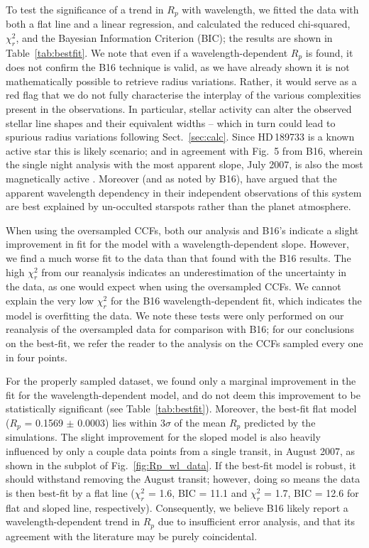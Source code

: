 \documentclass{aa}
\begin{document}
To test the significance of a trend in $R_p$ with wavelength, we fitted the data with both a flat line and a linear regression, and calculated the reduced chi-squared, $\chi^2_r$, and the Bayesian Information Criterion (BIC); the results are shown in Table~\ref{tab:bestfit}. We note that even if a wavelength-dependent $R_p$ is found, it does not confirm the B16 technique is valid, as we have already shown it is not mathematically possible to retrieve radius variations. Rather, it would serve as a red flag that we do not fully characterise the interplay of the various complexities present in the observations. In particular, stellar activity can alter the observed stellar line shapes and their equivalent widths -- which in turn could lead to spurious radius variations following Sect.~\ref{sec:calc}. Since HD\,189733 is a known active star this is likely scenario; and in agreement with Fig.~5 from B16, wherein the single night analysis with the most apparent slope, July 2007, is also the most magnetically active \citep{cegla16b}. Moreover (and as noted by B16), \cite{mccullough14} have argued that the apparent wavelength dependency in their independent observations of this system are best explained by un-occulted starspots rather than the planet atmosphere.

When using the oversampled CCFs, both our analysis and B16's indicate a slight improvement in fit for the model with a wavelength-dependent slope. However, we find a much worse fit to the data than that found with the B16 results. The high $\chi^2_r$ from our reanalysis indicates an underestimation of the uncertainty in the data, as one would expect when using the oversampled CCFs.  We cannot explain the very low $\chi^2_r$ for the B16 wavelength-dependent fit, which indicates the model is overfitting the data. We note these tests were only performed on our reanalysis of the oversampled data for comparison with B16; for our conclusions on the best-fit, we refer the reader to the analysis on the CCFs sampled every one in four points.

For the properly sampled dataset, we found only a marginal improvement in the fit for the wavelength-dependent model, and do not deem this improvement to be statistically significant (see Table~\ref{tab:bestfit}). Moreover, the best-fit flat model ($R_p$ = 0.1569 $\pm$ 0.0003) lies within 3$\sigma$ of the mean $R_p$ predicted by the simulations. The slight improvement for the sloped model is also heavily influenced by only a couple data points from a single transit, in August 2007, as shown in the subplot of Fig.~\ref{fig:Rp_wl_data}. If the best-fit model is robust, it should withstand removing the August transit; however, doing so means the data is then best-fit by a flat line ($\chi^2_r$ = 1.6, BIC = 11.1 and $\chi^2_r$ = 1.7, BIC = 12.6 for flat and sloped line, respectively).  Consequently, we believe B16 likely report a wavelength-dependent trend in $R_p$ due to insufficient error analysis, and that its agreement with the literature may be purely coincidental.  
\end{document}
